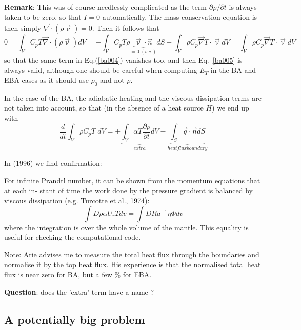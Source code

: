 \documentclass[a4paper,11pt]{article}
\begin{document}
{\bf Remark}:
This was of course needlessly complicated as the term $\partial \rho/\partial t$ is always 
taken to be zero, so that $I=0$ automatically. The mass conservation equation is then 
simply ${\vec\nabla}\cdot (\rho \vec{\upnu})=0$. Then it follows that 
\[
0
= \int_V C_p T {\vec\nabla} \cdot (\rho \vec{\upnu}) dV
=-\int_V C_p T \rho \underbrace{ \vec{\upnu} \cdot \vec{n}}_{=0 \; (b.c.)} dS 
+  \int_V \rho C_p  {\vec\nabla}  T \cdot \vec{\upnu} dV 
=  \int_V \rho C_p  \vec{\nabla}  T \cdot \vec{\upnu} dV 
\]
so that the same term in Eq.(\ref{ba004}) vanishes too, and then 
Eq.~\eqref{ba005} is always valid, although one should be careful 
when computing $E_T$ in the BA and EBA cases as it should use $\rho_0$ and not $\rho$.

In the case of the BA, the adiabatic heating and the viscous dissipation terms are not 
taken into account, so that (in the absence of a heat source $H$) 
we end up with 
\[
\frac{d}{dt} \int_V \rho C_p T \; dV 
= 
+\underbrace{\int_V \alpha T \frac{\partial p}{\partial t}  dV}_{{extra}}
- \underbrace{\int_S  \vec{q} \cdot \vec{n}  dS}_{{heatfluxboundary}} 
\]

In \cite{zhyu96b} (1996) we find confirmation:
\begin{displayquote}
{\color{darkgray}
For infinite Prandtl number, it can be shown
from the momentum equations that at each in-
stant of time the work done by the pressure
gradient is balanced by viscous dissipation (e.g.
Turcotte et al., 1974):
\[
\int D \rho \alpha U_r T dv = \int D Ra^{-1} \eta \Phi dv
\]
where the integration is over the whole volume of
the mantle. This equality is useful for checking
the computational code.}
\end{displayquote}



Note: Arie advises me to measure the total heat flux through the boundaries and normalise it 
by the top heat flux. His experience is that the normalised total heat flux is near zero 
for BA, but a few \% for EBA.

{\bf Question}: does the 'extra' term have a name ?


\subsection{A potentially big problem}
\end{document}
